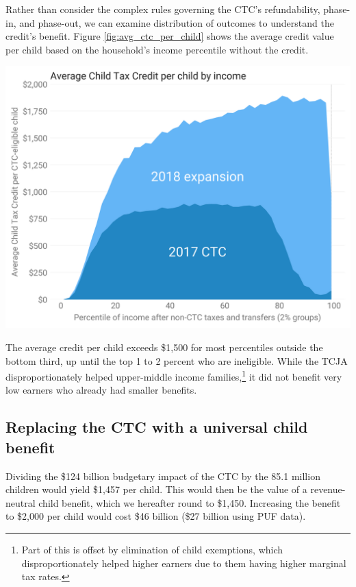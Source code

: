 \documentclass[12pt]{article}
\begin{document}
Rather than consider the complex rules governing the CTC's refundability, phase-in, and phase-out, we can examine distribution of outcomes to understand the credit's benefit. Figure \ref{fig:avg_ctc_per_child} shows the average credit value per child based on the household's income percentile without the credit.

\begin{center}
\includegraphics[width=15cm]{avg_ctc_per_child.png}
\label{fig:avg_ctc_per_child}
\end{center}

The average credit per child exceeds \$1,500 for most percentiles outside the bottom third, up until the top 1 to 2 percent who are ineligible. While the TCJA disproportionately helped upper-middle income families,\footnote{Part of this is offset by elimination of child exemptions, which disproportionately helped higher earners due to them having higher marginal tax rates.} it did not benefit very low earners who already had smaller benefits.

\subsection{Replacing the CTC with a universal child benefit}

Dividing the \$124 billion budgetary impact of the CTC by the 85.1 million children would yield \$1,457 per child. This would then be the value of a revenue-neutral child benefit, which we hereafter round to \$1,450. Increasing the benefit to \$2,000 per child would cost \$46 billion (\$27 billion using PUF data).
\end{document}
